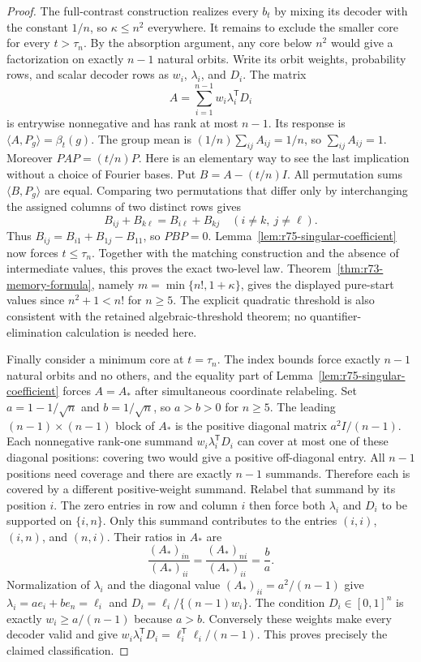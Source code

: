 \begin{proof}
The full-contrast construction realizes every $b_t$ by mixing its
decoder with the constant $1/n$, so $\kappa\le n^2$ everywhere.
It remains to exclude the smaller core for every $t>\tau_n$.
By the absorption argument, any core below $n^2$ would give a
factorization on exactly $n-1$ natural orbits. Write its orbit
weights, probability rows, and scalar decoder rows as
$w_i$, $\lambda_i$, and $D_i$. The matrix
\[
 A=\sum_{i=1}^{n-1}w_i\lambda_i^{\mathsf T}D_i
\]
is entrywise nonnegative and has rank at most $n-1$.
Its response is $\langle A,P_g\rangle=\beta_t(g)$.
The group mean is $(1/n)\sum_{ij}A_{ij}=1/n$, so
$\sum_{ij}A_{ij}=1$. Moreover $PAP=(t/n)P$.
Here is an elementary way to see the last implication without a
choice of Fourier bases. Put $B=A-(t/n)I$. All permutation sums
$\langle B,P_g\rangle$ are equal. Comparing two permutations
that differ only by interchanging the assigned columns of two
distinct rows gives
\[
 B_{ij}+B_{k\ell}=B_{i\ell}+B_{kj}
 \quad(i\ne k,\ j\ne\ell).
\]
Thus $B_{ij}=B_{i1}+B_{1j}-B_{11}$, so $PBP=0$.
Lemma~\ref{lem:r75-singular-coefficient} now forces $t\le\tau_n$.
Together with the matching construction and the absence of
intermediate values, this proves the exact two-level law.
Theorem~\ref{thm:r73-memory-formula}, namely
$m=\min\{n!,1+\kappa\}$, gives the displayed pure-start values since
$n^2+1<n!$ for $n\ge5$. The explicit quadratic threshold is also
consistent with the retained algebraic-threshold theorem; no
quantifier-elimination calculation is needed here.

Finally consider a minimum core at $t=\tau_n$. The index bounds
force exactly $n-1$ natural orbits and no others, and the equality
part of Lemma~\ref{lem:r75-singular-coefficient} forces $A=A_*$
after simultaneous coordinate relabeling. Set
$a=1-1/\sqrt n$ and $b=1/\sqrt n$, so $a>b>0$ for $n\ge5$.
The leading $(n-1)\times(n-1)$ block of $A_*$ is the positive
diagonal matrix $a^2I/(n-1)$. Each nonnegative rank-one summand
$w_i\lambda_i^{\mathsf T}D_i$ can cover at most one of these
diagonal positions: covering two would give a positive off-diagonal
entry. All $n-1$ positions need coverage and there are exactly
$n-1$ summands. Therefore each is covered by a different
positive-weight summand. Relabel that summand by its position $i$.
The zero entries in row and column $i$ then force both
$\lambda_i$ and $D_i$ to be supported on $\{i,n\}$.
Only this summand contributes to the entries $(i,i)$, $(i,n)$,
and $(n,i)$. Their ratios in $A_*$ are
\[
 \frac{(A_*)_{in}}{(A_*)_{ii}}
 =\frac{(A_*)_{ni}}{(A_*)_{ii}}=\frac ba.
\]
Normalization of $\lambda_i$ and the diagonal value
$(A_*)_{ii}=a^2/(n-1)$ give
$\lambda_i=ae_i+be_n=\ell_i$ and
$D_i=\ell_i/\{(n-1)w_i\}$. The condition $D_i\in[0,1]^n$
is exactly $w_i\ge a/(n-1)$ because $a>b$.
Conversely these weights make every decoder valid and give
$w_i\lambda_i^{\mathsf T}D_i=\ell_i^{\mathsf T}\ell_i/(n-1)$.
This proves precisely the claimed classification.
\end{proof}

